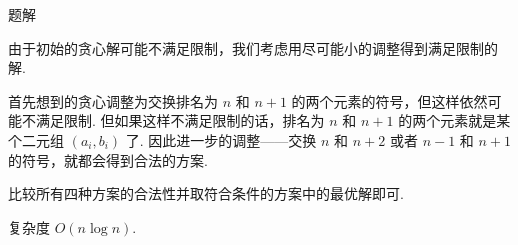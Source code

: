 \begin{frame}{题解}
	
	由于初始的贪心解可能不满足限制，我们考虑用尽可能小的调整得到满足限制的解. \pause

	首先想到的贪心调整为交换排名为 $n$ 和 $n+1$ 的两个元素的符号，但这样依然可能不满足限制. 但如果这样不满足限制的话，排名为 $n$ 和 $n+1$ 的两个元素就是某个二元组 $(a_i,b_i)$ 了. 因此进一步的调整——交换 $n$ 和 $n+2$ 或者 $n-1$ 和 $n+1$ 的符号，就都会得到合法的方案. \pause

	比较所有四种方案的合法性并取符合条件的方案中的最优解即可. \pause

	复杂度 $O(n\log n)$.


\end{frame}
